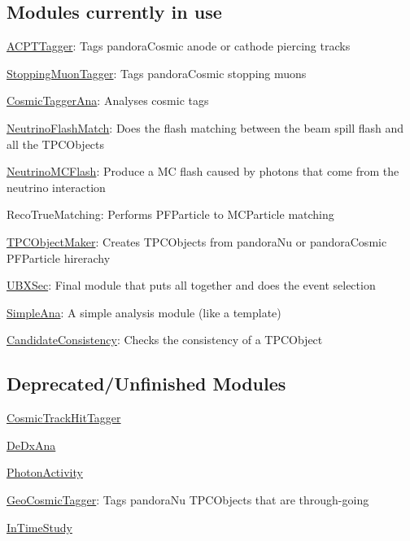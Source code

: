 \subsection*{Modules currently in use}


\begin{DoxyItemize}
\item \hyperlink{classACPTTagger}{A\-C\-P\-T\-Tagger}\-: Tags pandora\-Cosmic anode or cathode piercing tracks
\item \hyperlink{classStoppingMuonTagger}{Stopping\-Muon\-Tagger}\-: Tags pandora\-Cosmic stopping muons
\item \hyperlink{classCosmicTaggerAna}{Cosmic\-Tagger\-Ana}\-: Analyses cosmic tags
\item \hyperlink{classNeutrinoFlashMatch}{Neutrino\-Flash\-Match}\-: Does the flash matching between the beam spill flash and all the T\-P\-C\-Objects
\item \hyperlink{classNeutrinoMCFlash}{Neutrino\-M\-C\-Flash}\-: Produce a M\-C flash caused by photons that come from the neutrino interaction
\item Reco\-True\-Matching\-: Performs P\-F\-Particle to M\-C\-Particle matching
\item \hyperlink{classTPCObjectMaker}{T\-P\-C\-Object\-Maker}\-: Creates T\-P\-C\-Objects from pandora\-Nu or pandora\-Cosmic P\-F\-Particle hirerachy
\item \hyperlink{classUBXSec}{U\-B\-X\-Sec}\-: Final module that puts all together and does the event selection
\item \hyperlink{classSimpleAna}{Simple\-Ana}\-: A simple analysis module (like a template)
\item \hyperlink{classCandidateConsistency}{Candidate\-Consistency}\-: Checks the consistency of a T\-P\-C\-Object
\end{DoxyItemize}

\subsection*{Deprecated/\-Unfinished Modules}


\begin{DoxyItemize}
\item \hyperlink{classCosmicTrackHitTagger}{Cosmic\-Track\-Hit\-Tagger}
\item \hyperlink{classDeDxAna}{De\-Dx\-Ana}
\item \hyperlink{classPhotonActivity}{Photon\-Activity}
\item \hyperlink{classGeoCosmicTagger}{Geo\-Cosmic\-Tagger}\-: Tags pandora\-Nu T\-P\-C\-Objects that are through-\/going
\item \hyperlink{classInTimeStudy}{In\-Time\-Study} 
\end{DoxyItemize}